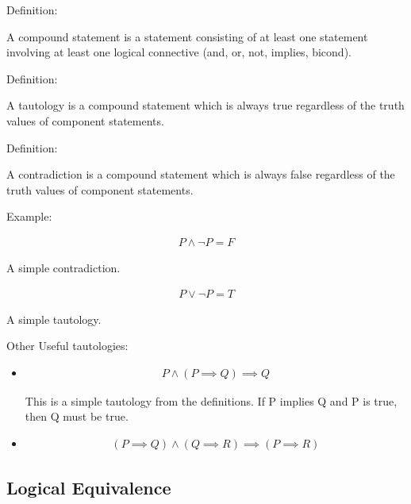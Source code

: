 \documentclass{report}
\begin{document}
Definition:
\begin{mdframed}
    A compound statement is a statement consisting
    of at least one statement involving at least one
    logical connective (and, or, not, implies, bicond).
\end{mdframed}

Definition:
\begin{mdframed}
    A tautology is a compound statement which is always
    true regardless of the truth values of component statements.
\end{mdframed}

Definition:
\begin{mdframed}
    A contradiction is a compound statement which is always
    false regardless of the truth values of component statements.
\end{mdframed}


Example:
\begin{mdframed}
    \begin{gather}
        P \land \neg P = F
    \end{gather}

    A simple contradiction.

    \begin{gather}
       P \lor \neg P = T 
    \end{gather}

    A simple tautology.


\end{mdframed}

Other Useful tautologies:
\begin{itemize}
    \item
        \begin{gather}
            P \land (P \implies Q) \implies Q
        \end{gather}

        This is a simple tautology from the definitions.
        If P implies Q and P is true, then Q must be true.
    \item 
        \begin{gather}
            (P \implies Q) \land (Q \implies R) \implies (P \implies R) 
        \end{gather}
\end{itemize}

\subsection{Logical Equivalence}
\end{document}
